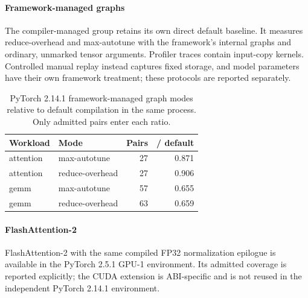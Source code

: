 \paragraph{Framework-managed graphs}

The compiler-managed group retains its own direct default baseline. It measures reduce-overhead and max-autotune with the framework's internal graphs and ordinary, unmarked tensor arguments. Profiler traces contain input-copy kernels. Controlled manual replay instead captures fixed storage, and model parameters have their own framework treatment; these protocols are reported separately.

\begin{table}[t]

\centering\small

\caption{PyTorch 2.14.1 framework-managed graph modes relative to default compilation in the same process. Only admitted pairs enter each ratio.}

\label{tab:compiler-graphs}

\begin{tabular}{@{}llrr@{}}

\toprule

Workload & Mode & Pairs & / default \\

\midrule

attention & max-autotune & 27 & 0.871 \\

attention & reduce-overhead & 27 & 0.906 \\

gemm & max-autotune & 57 & 0.655 \\

gemm & reduce-overhead & 63 & 0.659 \\

\bottomrule

\end{tabular}

\end{table}

\paragraph{FlashAttention-2}

FlashAttention-2 with the same compiled FP32 normalization epilogue is available in the PyTorch 2.5.1 GPU-1 environment. Its admitted coverage is reported explicitly; the CUDA extension is ABI-specific and is not reused in the independent PyTorch 2.14.1 environment.

